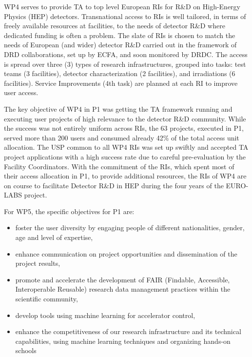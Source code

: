 
WP4 serves to provide TA to top level European RIs for R\&D on High-Energy Physics (HEP) detectors. Transnational access to RIs is well tailored, in terms of freely available resources at facilities, to the needs of detector R\&D where dedicated funding is often a problem. The slate of RIs is chosen to match the needs of European (and wider) detector R\&D carried out in the framework of DRD collaborations, set up by ECFA, and soon monitored by DRDC. The access is spread over three (3) types of research infrastructures, grouped into tasks: test teams (3 facilities), detector characterization (2 facilities), and irradiations (6 facilities). Service Improvements (4th task) are planned at each RI to improve user access.

The key objective of WP4 in P1 was getting the TA framework running and executing user projects of high relevance to the detector R\&D community. While the success was not entirely uniform across RIs, the 63 projects, executed in P1, served more than 200 users and consumed already 42\% of the total access unit allocation. The USP common to all WP4 RIs was set up swiftly and accepted TA project applications with a high success rate due to careful pre-evaluation by the Facility Coordinators. With the commitment of the RIs, which spent most of their access allocation in P1, to provide additional resources, the RIs of WP4 are on course to facilitate Detector R\&D in HEP during the four years of the EURO-LABS project.


For WP5, the specific objectives for P1 are: 
\begin{itemize}
    \item foster the user diversity by engaging people of different nationalities, gender, age and level of expertise,
    \item enhance communication on project opportunities and dissemination of the project results,
    \item promote and accelerate the development of FAIR (Findable, Accessible, Interoperable Reusable) research data management practices within the scientific community,
    \item develop tools using machine learning for accelerator control,
    \item enhance the competitiveness of our research infrastructure and its technical capabilities, using machine learning techniques and organizing hands-on schools
\end{itemize}

